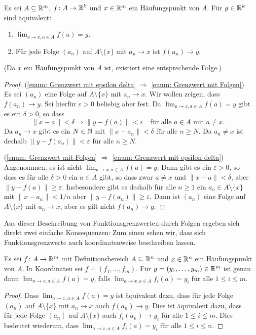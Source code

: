 \documentclass[a4paper,10pt]{article}
\begin{document}
\begin{lem}\label{lem: Funktionsgrenzwerte durch Folgen}
 Es sei $A \subseteq \mathbb{R}^m$, $f \colon A \to \mathbb{R}^k$ und $x \in \mathbb{R}^m$ ein Häufungspunkt von $A$. Für $y \in \mathbb{R}^k$ sind äquivalent:
 \begin{enumerate}
  \item\label{enum: Grenzwert mit epsilon delta}
   $\lim_{a \to x, a \in A} f(a) = y$.
  \item\label{enum: Grenzwert mit Folgen}
   Für jede Folge $(a_n)$ auf $A \setminus \{x\}$ mit $a_n \to x$ ist $f(a_n) \to y$.
 \end{enumerate}
 (Da $x$ ein Häufungspunkt von $A$ ist, existiert eine entsprechende Folge.)
\end{lem}
\begin{proof}
 (\ref{enum: Grenzwert mit epsilon delta} $\Rightarrow$ \ref{enum: Grenzwert mit Folgen}) Es sei $(a_n)$ eine Folge auf $A \setminus \{x\}$ mit $a_n \to x$. Wir wollen zeigen, dass $f(a_n) \to y$. Sei hierfür $\varepsilon > 0$ beliebig aber fest. Da $\lim_{a \to x, a \in A} f(a) = y$ gibt es ein $\delta > 0$, so dass
 \[
  \|x-a\| < \delta \Rightarrow \|y-f(a)\| < \varepsilon
  \quad \text{für alle $a \in A$ mit $a \neq x$}.
 \]
 Da $a_n \to x$ gibt es ein $N \in \mathbb{N}$ mit $\|x - a_n\| < \delta$ für alle $n \geq N$. Da $a_n \neq x$ ist deshalb $\|y-f(a_n)\| < \varepsilon$ für alle $n \geq N$.
 
 (\ref{enum: Grenzwert mit Folgen} $\Rightarrow$ \ref{enum: Grenzwert mit epsilon delta}) Angenommen, es ist nicht $\lim_{a \to x, a \in A} f(a) = y$. Dann gibt es ein $\varepsilon > 0$, so dass es für alle $\delta > 0$ ein $a \in A$ gibt, so dass zwar $a \neq x$ und $\|x-a\| < \delta$, aber $\|y-f(a)\| \geq \varepsilon$. Insbesondere gibt es deshalb für alle $n \geq 1$ ein $a_n \in A \setminus \{x\}$ mit $\|x-a_n\| < 1/n$ aber $\|y-f(a_n)\| \geq \varepsilon$. Dann ist $(a_n)$ eine Folge auf $A \setminus \{x\}$ mit $a_n \to x$, aber es gilt nicht $f(a_n) \rightarrow y$.
\end{proof}


Aus dieser Beschreibung von Funktionsgrenzwerten durch Folgen ergeben sich direkt zwei einfache Konsequenzen: Zum einen sehen wir, dass sich Funktionsgrenzwerte auch koordinatenweise beschreiben lassen.


\begin{lem}
 Es sei $f \colon A \to \mathbb{R}^m$ mit Definitionsbereich $A \subseteq \mathbb{R}^n$ und $x \in \mathbb{R}^n$ ein Häufungspunkt von $A$. In Koordinaten sei $f = (f_1, \dotsc, f_m)$. Für $y = (y_1, \dotsc, y_m) \in \mathbb{R}^m$ ist genau dann $\lim_{a \to x, a \in A} f(a) = y$, falls $\lim_{a \to x, a \in A} f_i(a) = y_i$ für alle $1 \leq i \leq m$.
\end{lem}
\begin{proof}
 Dass $\lim_{a \to x, a \in A} f(a) = y$ ist äquivalent dazu, dass für jede Folge $(a_n)$ auf $A \setminus \{x\}$ mit $a_n \to x$ auch $f(a_n) \to y$. Dies ist äquivalent dazu, dass für jede Folge $(a_n)$ auf $A \setminus \{x\}$ auch $f_i(a_n) \to y_i$ für alle $1 \leq i \leq m$. Dies bedeutet wiederum, dass $\lim_{a \to x, a \in A} f_i(a) = y_i$ für alle $1 \leq i \leq n$.
\end{proof}
\end{document}
